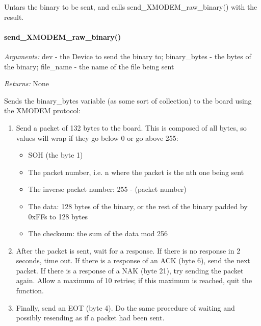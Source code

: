 \documentclass[12pt,letterpaper]{article}
\begin{document}
Untars the binary to be sent, and calls send\_XMODEM\_raw\_binary() with the result.



%
%
\paragraph{send\_XMODEM\_raw\_binary()}
\label{4.9.1.1}

\emph{Arguments:} dev - the Device to send the binary to; binary\_bytes - the bytes of the binary; file\_name - the name of the file being sent

\emph{Returns:} None

Sends the binary\_bytes variable (as some sort of collection) to the board using the XMODEM protocol:

\begin{enumerate}

\item Send a packet of 132 bytes to the board. This is composed of all bytes, so values will wrap if they go below 0 or go above 255:

\begin{itemize}

\item SOH (the byte 1)

\item The packet number, i.e. n where the packet is the nth one being sent

\item The inverse packet number: 255 - (packet number)

\item The data: 128 bytes of the binary, or the rest of the binary padded by 0xFFs to 128 bytes

\item The checksum: the sum of the data mod 256

\end{itemize}

\item After the packet is sent, wait for a response. If there is no response in 2 seconds, time out. If there is a response of an ACK (byte 6), send the next packet. If there is a response of a NAK (byte 21), try sending the packet again. Allow a maximum of 10 retries; if this maximum is reached, quit the function.

\item Finally, send an EOT (byte 4). Do the same procedure of waiting and possibly resending as if a packet had been sent.

\end{enumerate}
\end{document}
